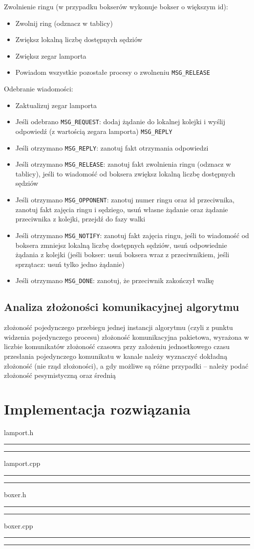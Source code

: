 \documentclass{article}
\begin{document}
Zwolnienie ringu (w przypadku bokserów wykonuje bokser o większym id):
\begin{itemize}
    \item Zwolnij ring (odznacz w tablicy)
    \item Zwiększ lokalną liczbę dostępnych sędziów
    \item Zwiększ zegar lamporta
    \item Powiadom wszystkie pozostałe procesy o zwolneniu \verb|MSG_RELEASE|
\end{itemize}

Odebranie wiadomości:
\begin{itemize}
    \item Zaktualizuj zegar lamporta
    \item Jeśli odebrano \verb|MSG_REQUEST|: dodaj żądanie do lokalnej
    kolejki i  wyślij odpowiedź (z wartością zegara lamporta) \verb|MSG_REPLY|
    \item Jeśli otrzymano \verb|MSG_REPLY|: zanotuj fakt otrzymania
    odpowiedzi
    \item Jeśli otrzymano \verb|MSG_RELEASE|: zanotuj fakt zwolnienia
    ringu (odznacz w tablicy), jeśli to wiadomość od boksera zwiększ
    lokalną liczbę dostępnych sędziów
    \item Jeśli otrzymano \verb|MSG_OPPONENT|: zanotuj numer ringu oraz
    id przeciwnika, zanotuj fakt zajęcia ringu i sędziego, usuń własne
    żądanie oraz żądanie przeciwnika z kolejki, przejdź do fazy walki
    \item Jeśli otrzymano \verb|MSG_NOTIFY|: zanotuj fakt zajęcia ringu,
    jeśli to wiadomość od boksera zmniejsz lokalną liczbę dostępnych
    sędziów, usuń odpowiednie żądania z kolejki (jeśli bokser: usuń
    boksera wraz z przeciwnikiem, jeśli sprzątacz: usuń tylko jedno
    żądanie)
    \item Jeśli otrzymano \verb|MSG_DONE|: zanotuj, że przeciwnik
    zakończył walkę
\end{itemize}


\subsection{Analiza złożoności komunikacyjnej algorytmu}
złożoność pojedynczego przebiegu jednej instancji algorytmu (czyli z punktu widzenia pojedynczego procesu) 
złożoność komunikacyjna pakietowa, wyrażona w liczbie komunikatów
złożoność czasowa przy założeniu jednostkowego czasu przesłania pojedynczego komunikatu w kanale
należy wyznaczyć dokładną złożoność (nie rząd złożoności), a gdy możliwe są różne przypadki – należy podać złożoność pesymistyczną oraz średnią

\section{Implementacja rozwiązania}
lamport.h
\hrule

\hrule
lamport.cpp
\hrule

\hrule
boxer.h
\hrule

\hrule
boxer.cpp
\hrule

\hrule
\end{document}
